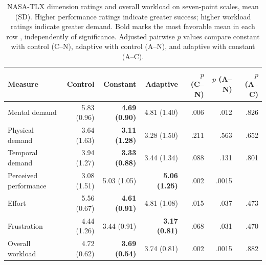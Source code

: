 \documentclass[sigconf,anonymous,balance=false]{aamas}
\providecommand{\DIFadd}[1]{{\protect\color{blue} \sf #1}} %
\providecommand{\DIFaddbegin}{} %
\providecommand{\DIFaddend}{} %
\providecommand{\DIFdelbegin}{} %
\providecommand{\DIFdelend}{} %
\providecommand{\DIFaddFL}[1]{\DIFadd{#1}} %
\providecommand{\DIFaddbeginFL}{} %
\providecommand{\DIFaddendFL}{} %
\providecommand{\DIFdelbeginFL}{} %
\providecommand{\DIFdelendFL}{} %
\begin{document}
\DIFdelbegin %
\DIFdelendFL \DIFaddbeginFL \begin{table}[t]
\DIFaddendFL \centering
\caption{NASA-TLX dimension ratings and overall workload on seven-point scales, mean (SD). Higher performance ratings indicate greater success; higher workload ratings indicate greater demand. Bold marks the most favorable mean in each row\DIFaddbeginFL \DIFaddFL{, independently of significance}\DIFaddendFL . \DIFaddbeginFL \DIFaddFL{Adjusted pairwise $p$ values compare constant with control (C--N), adaptive with control (A--N), and adaptive with constant (A--C).}\DIFaddendFL }
\label{tab:workload}
\begingroup
\DIFdelbeginFL %
\DIFdelendFL \DIFaddbeginFL \begin{tabular}{lrrrrrr}
\DIFaddendFL \toprule
Measure & Control & Constant & Adaptive \DIFaddbeginFL & \DIFaddFL{$p$ (C--N) }& \DIFaddFL{$p$ (A--N) }& \DIFaddFL{$p$ (A--C) }\DIFaddendFL \\
\midrule
Mental demand & 5.83 (0.96) & \textbf{4.69 (0.90)} & 4.81 (1.40) \DIFaddbeginFL & \DIFaddFL{.006 }& \DIFaddFL{.012 }& \DIFaddFL{.826 }\DIFaddendFL \\
Physical demand & 3.64 (1.63) & \textbf{3.11 (1.28)} & 3.28 (1.50) \DIFaddbeginFL & \DIFaddFL{.211 }& \DIFaddFL{.563 }& \DIFaddFL{.652 }\DIFaddendFL \\
Temporal demand & 3.94 (1.27) & \textbf{3.33 (0.88)} & 3.44 (1.34) \DIFaddbeginFL & \DIFaddFL{.088 }& \DIFaddFL{.131 }& \DIFaddFL{.801 }\DIFaddendFL \\
Perceived performance & 3.08 (1.51) & 5.03 (1.05) & \textbf{5.06 (1.25)} \DIFaddbeginFL & \DIFaddFL{.002 }& \DIFaddFL{.0015 }& \DIFaddFL{1.000 }\DIFaddendFL \\
Effort & 5.56 (0.67) & \textbf{4.61 (0.91)} & 4.81 (1.08) \DIFaddbeginFL & \DIFaddFL{.015 }& \DIFaddFL{.037 }& \DIFaddFL{.473 }\DIFaddendFL \\
Frustration & 4.44 (1.26) & 3.44 (0.91) & \textbf{3.17 (0.81)} \DIFaddbeginFL & \DIFaddFL{.068 }& \DIFaddFL{.031 }& \DIFaddFL{.470 }\DIFaddendFL \\
Overall workload & 4.72 (0.62) & \textbf{3.69 (0.54)} & 3.74 (0.81) \DIFaddbeginFL & \DIFaddFL{.002 }& \DIFaddFL{.0015 }& \DIFaddFL{.882 }\DIFaddendFL \\
\bottomrule
\end{tabular}
\endgroup
\DIFdelbeginFL %
\DIFdelend \DIFaddbegin \end{table}
\DIFaddend 
\end{document}
